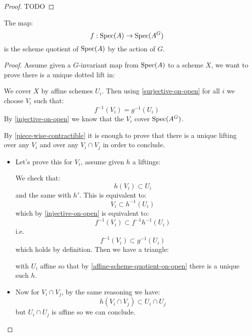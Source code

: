 \begin{proof}
TODO
\end{proof}

\begin{proposition}
The map:
\[f:\operatorname{Spec}(A)\to \operatorname{Spec}(A^G)\] 
is the scheme quotient of $\operatorname{Spec}(A)$ by the action of $G$.
\end{proposition}

\begin{proof}
Assume given a $G$-invariant map from $\operatorname{Spec}(A)$ to a scheme $X$, we want to prove there is a unique dotted lift in:
\begin{center}
\end{center}
We cover $X$ by affine schemes $U_i$. Then using \cref{surjective-on-open} for all $i$ we choose $V_i$ such that:
\[f^{-1}(V_i) = g^{-1}(U_i)\]
By \cref{injective-on-open} we know that the $V_i$ cover $\operatorname{Spec}(A^G)$. 

By \cref{piece-wise-contractible} it is enough to prove that there is a unique lifting over any $V_i$ and over any $V_i\cap V_j$ in order to conclude. 

\begin{itemize}

\item Let's prove this for $V_i$, assume given $h$ a liftings:
\begin{center}
\end{center}
We check that:
\[h(V_i) \subset U_i\] 
and the same with $h'$. This is equivalent to:
\[V_i \subset h^{-1}(U_i)\]
which by \cref{injective-on-open} is equivalent to:
\[f^{-1}(V_i)\subset f^{-1}h^{-1}(U_i)\]
i.e.
\[f^{-1}(V_i)\subset g^{-1}(U_i)\]
which holds by definition. Then we have a triangle:
\begin{center}
\end{center}
with $U_i$ affine so that by \cref{affine-scheme-quotient-on-open} there is a unique such $h$.

\item Now for $V_i\cap V_j$, by the same reasoning we have:
\[h(V_i\cap V_j) \subset U_i\cap U_j\] 
but $U_i\cap U_j$ is affine so we can conclude.
\end{itemize}

\end{proof}

